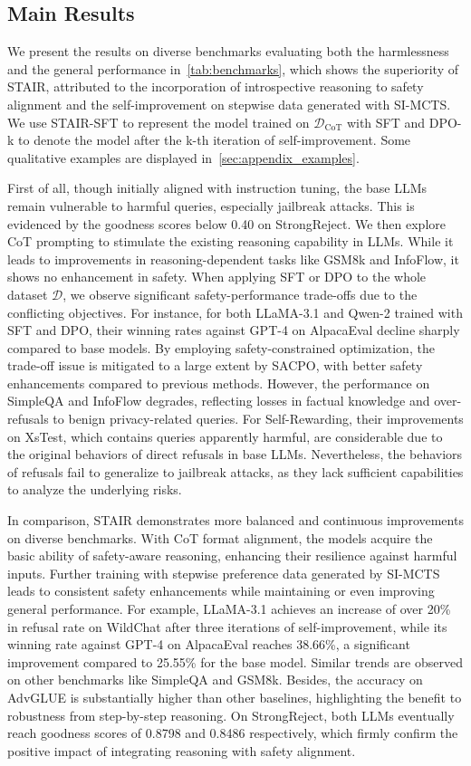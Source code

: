 \subsection{Main Results}

We present the results on diverse benchmarks evaluating both the harmlessness and the general performance in~\cref{tab:benchmarks}, which shows the superiority of STAIR, attributed to the incorporation of introspective reasoning to safety alignment and the self-improvement on stepwise data generated with SI-MCTS. 
We use STAIR-SFT to represent the model trained on $\mathcal{D}_\text{CoT}$ with SFT and DPO-k to denote the model after the k-th iteration of self-improvement. Some qualitative examples are displayed in~\cref{sec:appendix_examples}.

First of all, though initially aligned with instruction tuning, the base LLMs remain vulnerable to harmful queries, especially jailbreak attacks. This is evidenced by the goodness scores below 0.40 on StrongReject. We then explore CoT prompting to stimulate the existing reasoning capability in LLMs. While it leads to improvements in reasoning-dependent tasks like GSM8k and InfoFlow, it shows no enhancement in safety. When applying SFT or DPO to the whole dataset $\mathcal{D}$, we observe significant safety-performance trade-offs due to the conflicting objectives. For instance, for both LLaMA-3.1 and Qwen-2 trained with SFT and DPO, their winning rates against GPT-4 on AlpacaEval decline sharply compared to base models. By employing safety-constrained optimization, the trade-off issue is mitigated to a large extent by SACPO, with better safety enhancements compared to previous methods. However, the performance on SimpleQA and InfoFlow degrades, reflecting losses in factual knowledge and over-refusals to benign privacy-related queries. For Self-Rewarding, their improvements on XsTest, which contains queries apparently harmful, are considerable due to the original behaviors of direct refusals in base LLMs. Nevertheless, the behaviors of refusals fail to generalize to jailbreak attacks, as they lack sufficient capabilities to analyze the underlying risks. 

In comparison, STAIR demonstrates more balanced and continuous improvements on diverse benchmarks. With CoT format alignment, the models acquire the basic ability of safety-aware reasoning, enhancing their resilience against harmful inputs. Further training with stepwise preference data generated by SI-MCTS leads to consistent safety enhancements while maintaining or even improving general performance. For example, LLaMA-3.1 achieves an increase of over 20\% in refusal rate on WildChat after three iterations of self-improvement, while its winning rate against GPT-4 on AlpacaEval reaches 38.66\%, a significant improvement compared to 25.55\% for the base model. Similar trends are observed on other benchmarks like SimpleQA and GSM8k. Besides, the accuracy on AdvGLUE is substantially higher than other baselines, highlighting the benefit to robustness from step-by-step reasoning. On StrongReject, both LLMs eventually reach goodness scores of 0.8798 and 0.8486 respectively, which firmly confirm the positive impact of integrating reasoning with safety alignment.

